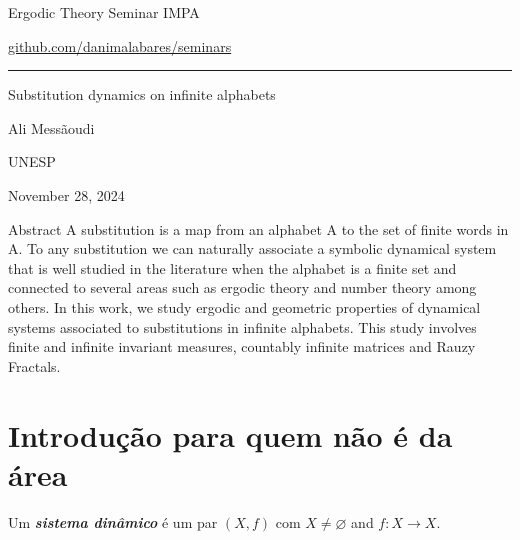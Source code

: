 


\begin{minipage}{\textwidth}
	\begin{minipage}{1\textwidth}
		Ergodic Theory Seminar \hfill IMPA
		
		{\small\hfill\href{https://github.com/danimalabares/seminars}{github.com/danimalabares/seminars}}

		
	\end{minipage}
\end{minipage}\vspace{.2cm}\hrule

\vspace{10pt}

{\Huge Substitution dynamics on infinite alphabets}

\hfill{\Large Ali Messãoudi}

{\Large \hfill UNESP}

\hfill{\large November 28, 2024}

\begin{thing4}{Abstract}\leavevmode
A substitution is a map from an alphabet A to the set
of finite words in A. To any substitution we can naturally associate
a symbolic dynamical system that is well studied in the literature
when the alphabet is a finite set and connected to several areas such
as ergodic theory and number theory among others. In this work,
we study ergodic and geometric properties of dynamical systems
associated to substitutions in infinite alphabets. This study involves
finite and infinite invariant measures, countably infinite matrices
and Rauzy Fractals.	
\end{thing4}

\tableofcontents

\section{Introdução para quem não é da área}

\begin{defn}\leavevmode
	Um \textit{\textbf{sistema dinâmico}}  é um par $(X,f)$ com  $X \neq  \varnothing$ and $f:X\to X$.
\end{defn}

